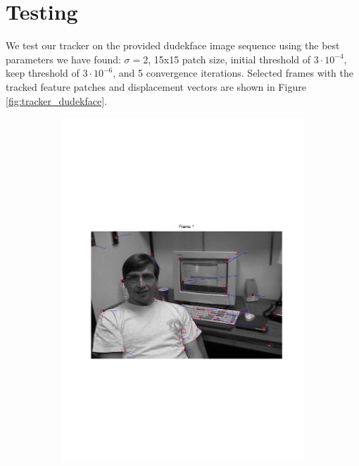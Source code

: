 \documentclass[11pt,a4paper]{article}
\begin{document}
\section{Testing}
%
We test our tracker on the provided dudekface image sequence using the best
parameters we have found: $\sigma = 2$, 15x15 patch size, initial threshold
of $3 \cdot 10^{-4}$, keep threshold of $3 \cdot 10^{-6}$, and 5 convergence
iterations. Selected frames with the tracked feature patches and displacement
vectors are shown in Figure \ref{fig:tracker_dudekface}.
%
\begin{figure}[H]
    \centering
    \begin{subfigure}{0.45\textwidth}
        \includegraphics[scale=0.4,trim={120 250 0 250}]{img/tracker_dudekface_1.pdf}
    \end{subfigure}
    \begin{subfigure}{0.45\textwidth}

\end{subfigure}
\end{figure}
\end{document}
